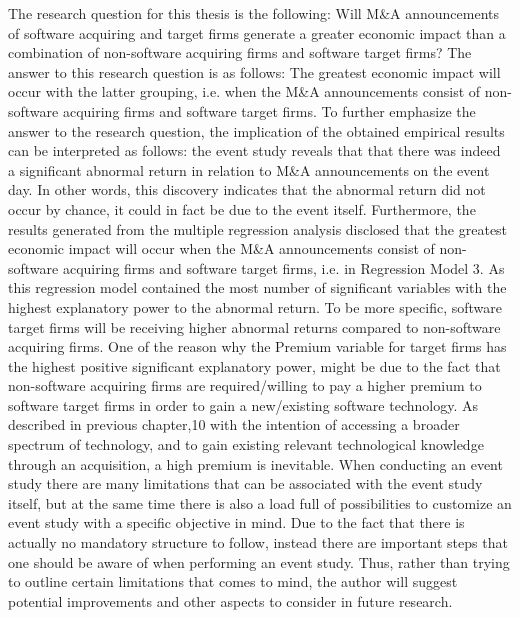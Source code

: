 \documentclass[preprint,10pt]{elsarticle}
\begin{document}
The research question for this thesis is the following: Will M\&A announcements of software acquiring and target firms generate a greater economic impact than a combination of non-software acquiring firms and software target firms? The answer to this research question is as follows: The greatest economic impact will occur with the latter grouping, i.e. when the M\&A announcements consist of non-software acquiring firms and software target firms.
To further emphasize the answer to the research question, the implication of the obtained empirical results can be interpreted as follows: the event study reveals that that there was indeed a significant abnormal return in relation to M\&A announcements on the event day. In other words, this discovery indicates that the abnormal return did not occur by chance, it could in fact be due to the event itself. Furthermore, the results generated from the multiple regression analysis disclosed that the greatest economic impact will occur when the M\&A announcements consist of non-software acquiring firms and software target firms, i.e. in Regression Model 3. As this regression model contained the most number of significant variables with the highest explanatory power to the abnormal return. To be more specific, software target firms will be receiving higher abnormal returns compared to non-software acquiring firms. One of the reason why the Premium variable for target firms has the highest positive significant explanatory power, might be due to the fact that non-software acquiring firms are required/willing to pay a higher premium to software target firms in order to gain a new/existing software technology. As described in previous chapter,10 with the intention of accessing a broader spectrum of technology, and to gain existing relevant technological knowledge through an acquisition, a high premium is inevitable.
When conducting an event study there are many limitations that can be associated with the event study itself, but at the same time there is also a load full of possibilities to customize an event study with a specific objective in mind. Due to the fact that there is actually no mandatory structure to follow, instead there are important steps that one should be aware of when performing an event study. Thus, rather than trying to outline certain limitations that comes to mind, the author will suggest potential improvements and other aspects to consider in future research.
\end{document}
